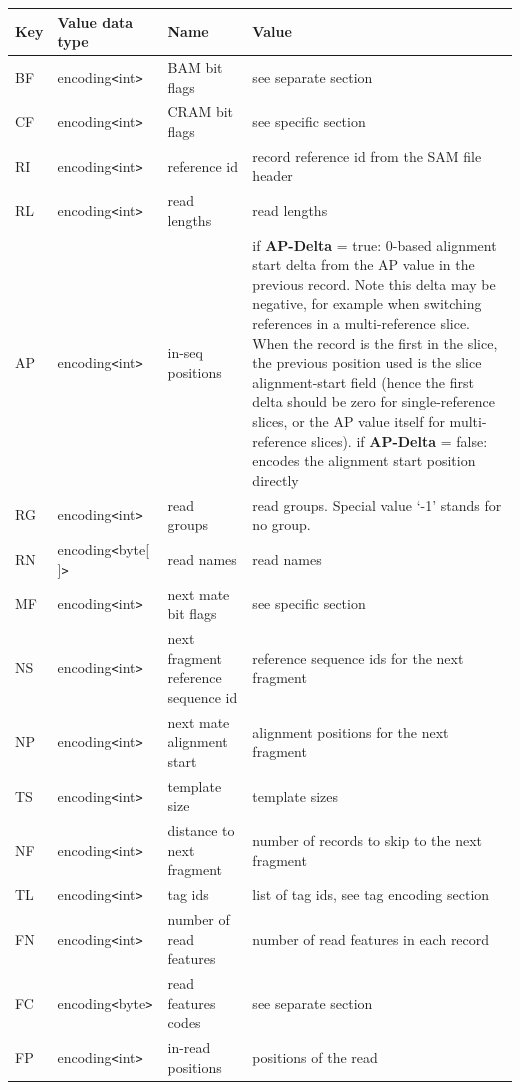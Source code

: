\documentclass[a4paper]{article}
\begin{document}
\begin{threeparttable}[t]
\begin{tabular}{|l|l|>{\raggedright}p{100pt}|>{\raggedright}p{220pt}|}
\hline
\textbf{Key} & \textbf{Value data type} & \textbf{Name} & \textbf{Value}\tabularnewline
\hline
BF & encoding\texttt{<}int\texttt{>} & BAM bit flags & see separate section\tabularnewline
\hline
CF & encoding\texttt{<}int\texttt{>} & CRAM bit flags & see specific section\tabularnewline
\hline
RI & encoding\texttt{<}int\texttt{>} & reference id & record reference id from
the SAM file header\tabularnewline
\hline
RL & encoding\texttt{<}int\texttt{>} & read lengths & read lengths\tabularnewline
\hline
AP & encoding\texttt{<}int\texttt{>} & in-seq positions & if \textbf{AP-Delta} = true: 0-based alignment start
delta from the AP value in the previous record.
Note this delta may be negative, for example when switching references in a multi-reference slice.
When the record is the first in the slice, the previous position used is the slice alignment-start field (hence the first delta should be zero for single-reference slices, or the AP value itself for multi-reference slices).  \linebreak{}
if \textbf{AP-Delta} = false: encodes the alignment start position directly\tabularnewline
\hline
RG & encoding\texttt{<}int\texttt{>} & read groups & read groups. Special value 
`-1' stands for no group.\tabularnewline
\hline
RN\tnote{a} & encoding\texttt{<}byte[ ]\texttt{>} & read names & read names\tabularnewline
\hline
MF & encoding\texttt{<}int\texttt{>} & next mate bit flags & see specific section\tabularnewline
\hline
NS & encoding\texttt{<}int\texttt{>} & next fragment reference sequence id & reference 
sequence ids for the next fragment \tabularnewline
\hline
NP & encoding\texttt{<}int\texttt{>} & next mate alignment start & alignment positions 
for the next fragment\tabularnewline
\hline
TS & encoding\texttt{<}int\texttt{>} & template size & template sizes\tabularnewline
\hline
NF & encoding\texttt{<}int\texttt{>} & distance to next fragment & number of records
to skip to the next fragment\tnote{b}\tabularnewline
\hline
TL\tnote{c} & encoding\texttt{<}int\texttt{>} & tag ids  & list of tag ids, see tag encoding
section\tabularnewline
\hline
FN & encoding\texttt{<}int\texttt{>} & number of read features & number of read
features in each record\tabularnewline
\hline
FC & encoding\texttt{<}byte\texttt{>} & read features codes & see separate section\tabularnewline
\hline
FP & encoding\texttt{<}int\texttt{>} & in-read positions & positions of the read

\end{tabular}
\end{threeparttable}
\end{document}
